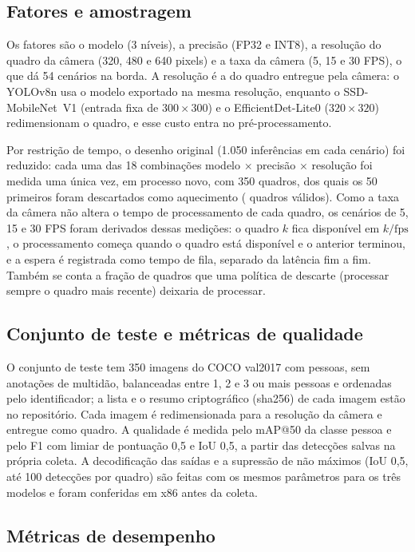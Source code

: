 \subsection{Fatores e amostragem}

Os fatores são o modelo (3 níveis), a precisão (FP32 e INT8), a resolução do quadro da câmera (320, 480 e 640 pixels) e a taxa da câmera (5, 15 e 30 FPS), o que dá 54 cenários na borda. A resolução é a do quadro entregue pela câmera: o YOLOv8n usa o modelo exportado na mesma resolução, enquanto o SSD-MobileNet~V1 (entrada fixa de $300\times300$) e o EfficientDet-Lite0 ($320\times320$) redimensionam o quadro, e esse custo entra no pré-processamento.

Por restrição de tempo, o desenho original (1.050 inferências em cada cenário) foi reduzido: cada uma das 18 combinações modelo $\times$ precisão $\times$ resolução foi medida uma única vez, em processo novo, com 350 quadros, dos quais os 50 primeiros foram descartados como aquecimento (\nQuadrosValidos{} quadros válidos). Como a taxa da câmera não altera o tempo de processamento de cada quadro, os cenários de 5, 15 e 30 FPS foram derivados dessas medições: o quadro $k$ fica disponível em $k/\text{fps}$, o processamento começa quando o quadro está disponível e o anterior terminou, e a espera é registrada como tempo de fila, separado da latência fim a fim. Também se conta a fração de quadros que uma política de descarte (processar sempre o quadro mais recente) deixaria de processar.

\subsection{Conjunto de teste e métricas de qualidade}

O conjunto de teste tem 350 imagens do COCO val2017 \citep{lin2014coco} com pessoas, sem anotações de multidão, balanceadas entre 1, 2 e 3 ou mais pessoas e ordenadas pelo identificador; a lista e o resumo criptográfico (sha256) de cada imagem estão no repositório. Cada imagem é redimensionada para a resolução da câmera e entregue como quadro. A qualidade é medida pelo mAP@50 da classe pessoa \citep{cocoapi2026} e pelo F1 com limiar de pontuação 0,5 e IoU 0,5, a partir das detecções salvas na própria coleta. A decodificação das saídas e a supressão de não máximos (IoU 0,5, até 100 detecções por quadro) são feitas com os mesmos parâmetros para os três modelos e foram conferidas em x86 antes da coleta.

\subsection{Métricas de desempenho}


